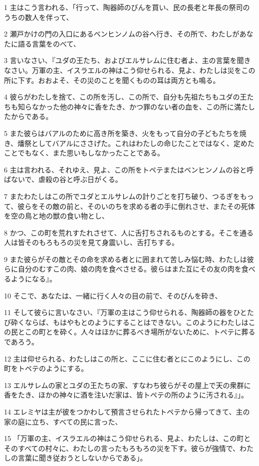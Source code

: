 \par 1 主はこう言われる、「行って、陶器師のびんを買い、民の長老と年長の祭司のうちの数人を伴って、
\par 2 瀬戸かけの門の入口にあるベンヒンノムの谷へ行き、その所で、わたしがあなたに語る言葉をのべて、
\par 3 言いなさい、『ユダの王たち、およびエルサレムに住む者よ、主の言葉を聞きなさい。万軍の主、イスラエルの神はこう仰せられる、見よ、わたしは災をこの所に下す。おおよそ、その災のことを聞くものの耳は両方とも鳴る。
\par 4 彼らがわたしを捨て、この所を汚し、この所で、自分も先祖たちもユダの王たちも知らなかった他の神々に香をたき、かつ罪のない者の血を、この所に満たしたからである。
\par 5 また彼らはバアルのために高き所を築き、火をもって自分の子どもたちを焼き、燔祭としてバアルにささげた。これはわたしの命じたことではなく、定めたことでもなく、また思いもしなかったことである。
\par 6 主は言われる、それゆえ、見よ、この所をトペテまたはベンヒンノムの谷と呼ばないで、虐殺の谷と呼ぶ日がくる。
\par 7 またわたしはこの所でユダとエルサレムの計りごとを打ち破り、つるぎをもって、彼らをその敵の前と、そのいのちを求める者の手に倒れさせ、またその死体を空の鳥と地の獣の食い物とし、
\par 8 かつ、この町を荒れすたれさせて、人に舌打ちされるものとする。そこを通る人は皆そのもろもろの災を見て身震いし、舌打ちする。
\par 9 また彼らがその敵とその命を求める者とに囲まれて苦しみ悩む時、わたしは彼らに自分のむすこの肉、娘の肉を食べさせる。彼らはまた互にその友の肉を食べるようになる』。
\par 10 そこで、あなたは、一緒に行く人々の目の前で、そのびんを砕き、
\par 11 そして彼らに言いなさい、『万軍の主はこう仰せられる、陶器師の器をひとたび砕くならば、もはやもとのようにすることはできない。このようにわたしはこの民とこの町とを砕く。人々はほかに葬るべき場所がないために、トペテに葬るであろう。
\par 12 主は仰せられる、わたしはこの所と、ここに住む者とにこのようにし、この町をトペテのようにする。
\par 13 エルサレムの家とユダの王たちの家、すなわち彼らがその屋上で天の衆群に香をたき、ほかの神々に酒を注いだ家は、皆トペテの所のように汚される』」。
\par 14 エレミヤは主が彼をつかわして預言させられたトペテから帰ってきて、主の家の庭に立ち、すべての民に言った、
\par 15 「万軍の主、イスラエルの神はこう仰せられる、見よ、わたしは、この町とそのすべての村々に、わたしの言ったもろもろの災を下す。彼らが強情で、わたしの言葉に聞き従おうとしないからである」。

